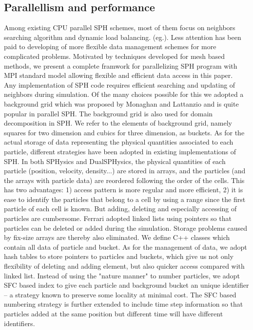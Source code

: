\documentclass[10pt,a4paper]{article}
\begin{document}
\subsection{Parallellism and performance}
Among existing CPU parallel SPH schemes, most of them focus on neighbors searching algorithm and dynamic load balancing. (eg.\cite{ferrari2009new, crespo2015dualsphysics}). Less attention has been paid to developing of more flexible data management schemes for more complicated problems. Motivated by techniques developed for mesh based methods, we present a complete framwork for parallelizing SPH program with MPI standard model allowing flexible and efficient data access in this paper.\\
Any implementation of SPH code requires efficient searching and updating of neighbors during simulation. Of the many choices possible for this we adopted a background grid which was proposed by Monaghan and Lattanzio\cite{monaghan1985refined} and is quite popular in parallel SPH. The background grid is also used for domain decomposition in SPH. We refer to the elements of background grid, namely squares for two dimension and cubics for three dimension, as buckets. 
As for the actual storage of data representing the physical quantities associated to each particle, different strategies have been adopted in existing implementations of SPH. 
In both SPHysics and DualSPHysics\cite{crespo2015dualsphysics}, the physical quantities of each particle (position, velocity, density...) are stored in arrays, and the particles (and the arrays with particle data) are reordered following the order of the cells. This has two advantages: 1) access pattern is more regular and more efficient, 2) it is ease to identify the particles that belong to a cell by using a range since the first particle of each cell is known. But adding, deleting and especially accessing of particles are cumbersome. Ferrari\cite{ferrari2009new} adopted linked lists using pointers so that particles can be deleted or added during the simulation. Storage problems caused by fix-size arrays are thereby also eliminated. We define C++ classes which contain all data of particle and bucket. As for the management of data, we adopt hash tables to store pointers to particles and buckets, which give us not only flexibility of deleting and adding element, but also quicker access compared with linked list. Instead of using the "nature manner" to number particles, we adopt SFC based index to give each particle and background bucket an unique identifier -- a strategy known to preserve some locality at minimal cost. The SFC based numbering strategy is further extended to include time step information so that particles added at the same position but different time will have different identifiers. 
\end{document}
